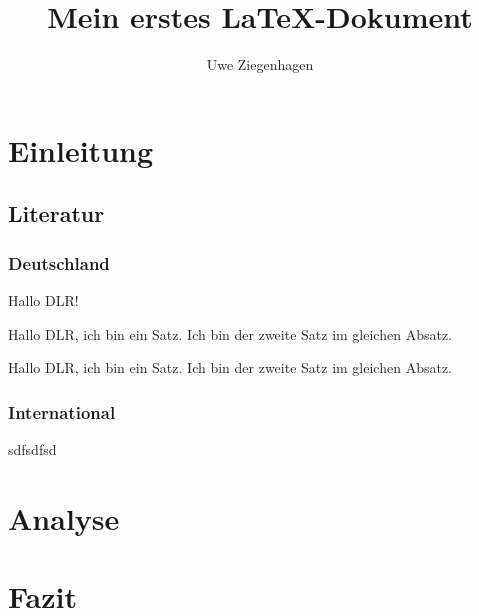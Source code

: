 \documentclass[12pt,ngerman,parskip=half]{scrartcl}
\author{Uwe Ziegenhagen}
\title{Mein erstes LaTeX-Dokument}
\begin{document}
\maketitle

\tableofcontents

\section{Einleitung}
\subsection{Literatur}

\subsubsection{Deutschland}

Hallo DLR!

Hallo DLR, ich bin ein Satz. Ich bin der zweite Satz im gleichen Absatz.

Hallo DLR, ich bin ein Satz.  Ich bin der zweite Satz im gleichen Absatz.

\subsubsection{International}

sdfsdfsd


\blindtext

\section{Analyse} 

\blindtext

\blindtext[10]

\section{Fazit}
\end{document}
